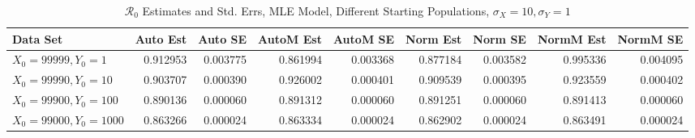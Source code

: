 \documentclass[12pt]{article}
\newcommand{\rr}{\ensuremath{\mathcal{R}_0}}
\begin{document}
\begin{table}[H]
	
	\caption{$\rr$ Estimates and Std. Errs, MLE Model,
		Different Starting Populations, 
		$\sigma_X = 10, \sigma_Y = 1$}
	\begin{footnotesize}
		\hskip -1.7cm
		\begin{tabular}{l|r|r|r|r|r|r|r|r}
			\hline
			Data Set & Auto Est & Auto SE & AutoM Est & AutoM SE & Norm Est & Norm SE & NormM Est & NormM SE\\
			\hline
			$X_0 = 99999, Y_0 = 1$ & 0.912953 & 0.003775 & 0.861994 & 0.003368 & 0.877184 & 0.003582 & 0.995336 & 0.004095\\
			\hline
			$X_0 = 99990, Y_0 = 10$ & 0.903707 & 0.000390 & 0.926002 & 0.000401 & 0.909539 & 0.000395 & 0.923559 & 0.000402\\
			\hline
			$X_0 = 99900, Y_0 = 100$ & 0.890136 & 0.000060 & 0.891312 & 0.000060 & 0.891251 & 0.000060 & 0.891413 & 0.000060\\
			\hline
			$X_0 = 99000, Y_0 = 1000$ & 0.863266 & 0.000024 & 0.863334 & 0.000024 & 0.862902 & 0.000024 & 0.863491 & 0.000024\\
			\hline
		\end{tabular}
	\end{footnotesize}
\end{table}
\end{document}

